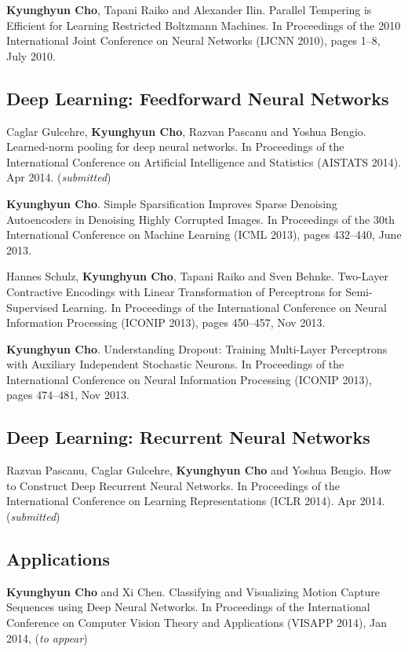 \documentclass[11pt, oneside]{essay}
\begin{document}
\textbf{Kyunghyun Cho}, Tapani Raiko and Alexander Ilin. Parallel
Tempering is Efficient for Learning Restricted Boltzmann
Machines. In Proceedings of the 2010 International Joint
Conference on Neural Networks (IJCNN 2010), pages 1--8, July
2010.



\subsection{Deep Learning: Feedforward Neural Networks}

Caglar Gulcehre, \textbf{Kyunghyun Cho}, Razvan Pascanu and Yoshua Bengio.
Learned-norm pooling for deep neural networks. 
In Proceedings of the International Conference on Artificial
Intelligence and Statistics (AISTATS 2014). Apr 2014. (\textit{submitted})

\textbf{Kyunghyun Cho}. Simple Sparsification Improves Sparse
Denoising Autoencoders in Denoising Highly Corrupted Images.
In Proceedings of the 30th International Conference on
Machine Learning (ICML 2013), pages 432--440, June 2013.

Hannes Schulz, \textbf{Kyunghyun Cho}, Tapani Raiko and Sven Behnke.
Two-Layer Contractive Encodings with Linear Transformation
of Perceptrons for Semi-Supervised Learning. 
In Proceedings of the International Conference on Neural
Information Processing (ICONIP 2013), pages 450--457, Nov 2013.

\textbf{Kyunghyun Cho}.
Understanding Dropout: Training Multi-Layer Perceptrons with
Auxiliary Independent Stochastic Neurons. 
In Proceedings of the International Conference on Neural
Information Processing (ICONIP 2013), pages 474--481, Nov 2013.

\subsection{Deep Learning: Recurrent Neural Networks}

Razvan Pascanu, Caglar Gulcehre, \textbf{Kyunghyun Cho} and Yoshua Bengio.
How to Construct Deep Recurrent Neural Networks. 
In Proceedings of the International Conference on Learning
Representations (ICLR 2014). Apr 2014. (\textit{submitted})


\subsection{Applications}

\textbf{Kyunghyun Cho} and Xi Chen.  Classifying and
Visualizing Motion Capture Sequences using Deep Neural
Networks.  In Proceedings of the International Conference on
Computer Vision Theory and Applications (VISAPP 2014), Jan
2014, (\textit{to appear})
\end{document}
